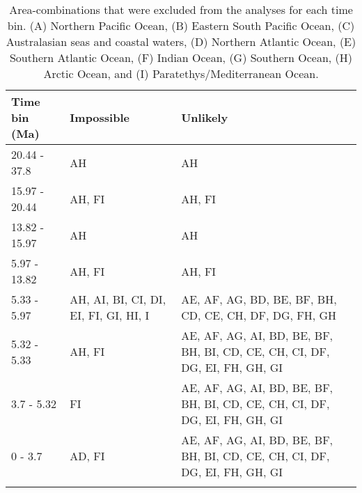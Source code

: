 \begin{longtable}{lll}

\caption{Area-combinations that were excluded from the analyses for each time bin. (A) Northern Pacific Ocean, (B) Eastern South Pacific Ocean, (C) Australasian seas and coastal waters, (D) Northern Atlantic Ocean, (E) Southern Atlantic Ocean, (F) Indian Ocean, (G) Southern Ocean, (H) Arctic Ocean, and (I) Paratethys/Mediterranean Ocean.}\\

\hline
\textbf{Time bin (Ma)} & \textbf{Impossible} & \textbf{Unlikely}\\
\hline
20.44 - 37.8 &
AH &
AH \\
15.97 - 20.44  &
AH, FI &
AH, FI\\
13.82 - 15.97 & 
AH &
AH\\
5.97 - 13.82 &
AH, FI &
AH, FI\\
5.33 - 5.97  &
AH, AI, BI, CI, DI, EI, FI, GI, HI, I &
AE, AF, AG, BD, BE, BF, BH, CD, CE, CH, DF, DG, FH, GH\\
5.32 - 5.33 &
AH, FI &
AE, AF, AG, AI, BD, BE, BF, BH, BI, CD, CE, CH, CI, DF, DG, EI, FH, GH, GI\\ 
3.7 - 5.32 &
FI &
AE, AF, AG, AI, BD, BE, BF, BH, BI, CD, CE, CH, CI, DF, DG, EI, FH, GH, GI\\ 
0 - 3.7  &
AD, FI &
AE, AF, AG, AI, BD, BE, BF, BH, BI, CD, CE, CH, CI, DF, DG, EI, FH, GH, GI\\
\hline

\label{table-states}
\end{longtable}
